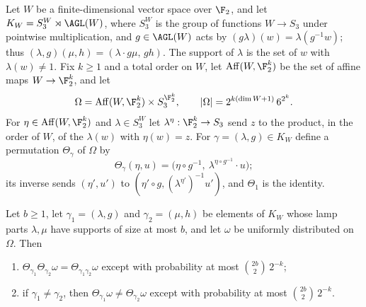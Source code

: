 Let $W$ be a finite-dimensional vector space over $\F_2$, and let $K_W=S_3^W\rtimes\AGL(W)$, where $S_3^W$ is the group of functions
$W\to S_3$ under pointwise multiplication, and $g\in\AGL(W)$ acts by $(g\lambda)(w)=\lambda(g^{-1}w)$; thus $(\lambda,g)(\mu,h)=(\lambda\cdot g\mu,\,gh)$.
The support of $\lambda$ is the set of $w$ with $\lambda(w)\ne1$. Fix $k\ge1$ and a total order on $W$, let $\operatorname{Aff}(W,\F_2^k)$ be the
set of affine maps $W\to\F_2^k$, and let
\[
\Omega=\operatorname{Aff}(W,\F_2^k)\times S_3^{\F_2^k},\qquad |\Omega|=2^{k(\dim W+1)}\,6^{2^k}.
\]
For $\eta\in\operatorname{Aff}(W,\F_2^k)$ and $\lambda\in S_3^W$ let $\lambda^\eta:\F_2^k\to S_3$ send $z$ to the product, in the order of $W$, of the
$\lambda(w)$ with $\eta(w)=z$. For $\gamma=(\lambda,g)\in K_W$ define a permutation $\Theta_\gamma$ of $\Omega$ by
\[
\Theta_\gamma(\eta,u)=\bigl(\eta\circ g^{-1},\ \lambda^{\eta\circ g^{-1}}\cdot u\bigr);
\]
its inverse sends $(\eta',u')$ to $(\eta'\circ g,(\lambda^{\eta'})^{-1}u')$, and $\Theta_1$ is the identity.

\begin{lemma}\label{lem:hash}
Let $b\ge1$, let $\gamma_1=(\lambda,g)$ and $\gamma_2=(\mu,h)$ be elements of $K_W$ whose lamp parts $\lambda,\mu$ have supports of size at most
$b$, and let $\omega$ be uniformly distributed on $\Omega$. Then
\begin{enumerate}[label=(\roman*),itemsep=1pt]
\item $\Theta_{\gamma_1}\Theta_{\gamma_2}\omega=\Theta_{\gamma_1\gamma_2}\omega$ except with probability at most $\binom{2b}2\,2^{-k}$;
\item if $\gamma_1\ne\gamma_2$, then $\Theta_{\gamma_1}\omega\ne\Theta_{\gamma_2}\omega$ except with probability at most $\binom{2b}2\,2^{-k}$.
\end{enumerate}
\end{lemma}

